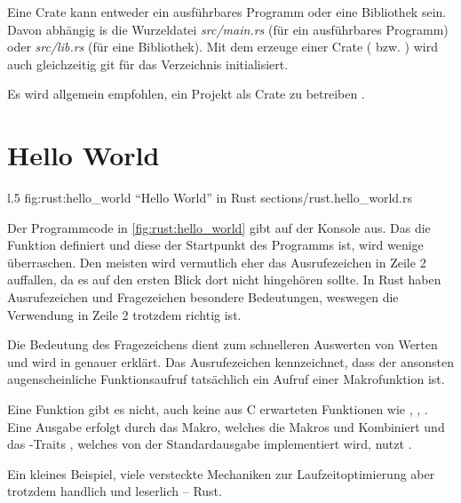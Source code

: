 Eine Crate kann entweder ein ausführbares Programm oder eine Bibliothek sein.
Davon abhängig is die Wurzeldatei \textit{src/main.rs} (für ein ausführbares Programm) oder \textit{src/lib.rs} (für eine Bibliothek).
Mit dem erzeuge einer Crate ( bzw. ) wird auch gleichzeitig \gls{git} für das Verzeichnis initialisiert.

Es wird allgemein empfohlen, ein Projekt als Crate zu betreiben .


\section{Hello World}


\begin{wrapfigure}{l}{.5\textwidth}
	\rustcinclude
		{fig:rust:hello_world}
		{\enquote{Hello World} in Rust}
		{sections/rust.hello_world.rs}
\end{wrapfigure}

Der Programmcode in \autoref{fig:rust:hello_world} gibt auf der Konsole  aus.
Das  die Funktion  definiert und diese der Startpunkt des Programms ist, wird wenige überraschen.
Den meisten wird vermutlich eher das Ausrufezeichen in Zeile 2 auffallen, da es auf den ersten Blick dort nicht hingehören sollte.
In Rust haben Ausrufezeichen und Fragezeichen besondere Bedeutungen, weswegen die Verwendung in Zeile 2 trotzdem richtig ist.

Die Bedeutung des Fragezeichens dient zum schnelleren Auswerten von  Werten und wird in  genauer erklärt.
Das Ausrufezeichen kennzeichnet, dass der ansonsten augenscheinliche Funktionsaufruf tatsächlich ein Aufruf einer Makrofunktion ist.

Eine Funktion  gibt es nicht, auch keine aus C erwarteten Funktionen wie , , .
Eine Ausgabe erfolgt durch das  Makro, welches die Makros   und  Kombiniert und das -Traits , welches von der Standardausgabe implementiert wird, nutzt .

Ein kleines Beispiel, viele versteckte Mechaniken zur Laufzeitoptimierung aber trotzdem handlich und leserlich -- Rust.

